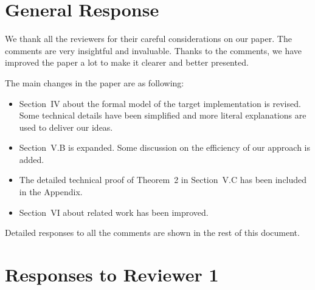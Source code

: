 \documentclass[10pt,journal]{IEEEtran}
\begin{document}
\section{General Response}
We thank all the reviewers for their careful considerations on our
paper. The comments are very insightful and invaluable. Thanks to the
comments, we have improved the paper a lot to make it clearer and
better presented.

The main changes in the paper are as following:
\begin{itemize}
\item
Section~IV about the formal model of the target implementation is
revised. Some technical details have been simplified and more literal
explanations are used to deliver our ideas.

\item
Section~V.B is expanded. Some discussion on the efficiency of our
approach is added.

\item 
The detailed technical proof of Theorem~2 in Section~V.C has been
included in the Appendix.

\item
Section~VI about related work has been improved. 
\end{itemize}

Detailed responses to all the comments are shown in the rest of this
document.


\section{Responses to Reviewer 1}
\end{document}
